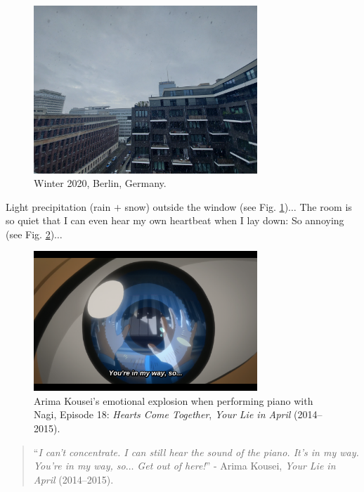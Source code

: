 \documentclass[12pt]{article}
\numberwithin{equation}{section}
\begin{document}
\begin{figure}[H]
    \centering
    \includegraphics[width=0.75\textwidth]{Berlin_winter2020}
    \caption{Winter 2020, Berlin, Germany.}
    \label{fig1}
\end{figure}
Light precipitation (rain $+$ snow) outside the window (see Fig. \ref{fig1})$\ldots$ The room is so quiet that I can even hear my own heartbeat when I lay down: So annoying (see Fig. \ref{fig2})$\ldots$

\begin{figure}[h]
    \centering
    \includegraphics[width=0.75\textwidth]{Arima_Kousei_you_are_in_my_way}
    \caption{Arima Kousei's emotional explosion when performing piano with Nagi, Episode 18: \textit{Hearts Come Together}, \textit{Your Lie in April} (2014--2015).}
    \label{fig2}
\end{figure}

\begin{quotation}
    ``\textit{I can't concentrate. I can still hear the sound of the piano. It's in my way. You're in my way, so$\ldots$ Get out of here!}'' - Arima Kousei, \textit{Your Lie in April} (2014--2015).
\end{quotation}
\end{document}
